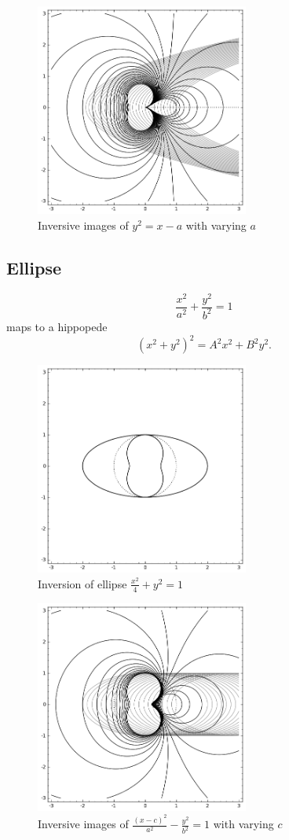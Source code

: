 \documentclass{article}
\begin{document}
\begin{figure}[htb]
\centering
\includegraphics[width=70mm]{./images/parabola_locus.png}
\caption{\label{fig:}Inversive images of $y^2 = x-a$ with varying $a$}
\end{figure}

\subsection{Ellipse}
\label{sec-2-3}
\begin{equation}
\label{ }
\frac{x^2}{a^2} + \frac{y^2}{b^2} =1
\end{equation}
maps to a hippopede
\begin{equation}
\label{ }
(x^2 + y^2)^2 = A^2x^2 + B^2 y^2.
\end{equation}

\begin{figure}[htb]
\centering
\includegraphics[width=70mm]{./images/ell_vase.png}
\caption{\label{fig:para-drop}Inversion of ellipse $\frac{x^2}{4}+y^2 = 1$}
\end{figure}

\begin{figure}[htb]
\centering
\includegraphics[width=70mm]{./images/ellipse_locus.png}
\caption{\label{fig:}Inversive images of $\frac{(x-c)^2}{a^2} -\frac{y^2}{b^2} = 1$ with varying $c$}
\end{figure}
\end{document}

